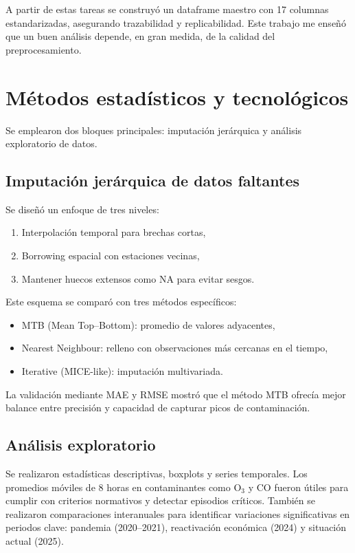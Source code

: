 \documentclass[12pt]{article}
\begin{document}
A partir de estas tareas se construyó un dataframe maestro con 17 columnas estandarizadas, asegurando trazabilidad y replicabilidad. Este trabajo me enseñó que un buen análisis depende, en gran medida, de la calidad del preprocesamiento.

\section*{Métodos estadísticos y tecnológicos}
Se emplearon dos bloques principales: imputación jerárquica y análisis exploratorio de datos.
\subsection*{Imputación jerárquica de datos faltantes}
Se diseñó un enfoque de tres niveles:
\begin{enumerate}[label=\arabic*.]
  \item Interpolación temporal para brechas cortas,
  \item Borrowing espacial con estaciones vecinas,
  \item Mantener huecos extensos como NA para evitar sesgos.
\end{enumerate}

Este esquema se comparó con tres métodos específicos:
\begin{itemize}
  \item MTB (Mean Top--Bottom): promedio de valores adyacentes,
  \item Nearest Neighbour: relleno con observaciones más cercanas en el tiempo,
  \item Iterative (MICE-like): imputación multivariada.
\end{itemize}

La validación mediante MAE y RMSE mostró que el método MTB ofrecía mejor balance entre precisión y capacidad de capturar picos de contaminación.

\subsection*{Análisis exploratorio}
Se realizaron estadísticas descriptivas, boxplots y series temporales. Los promedios móviles de 8 horas en contaminantes como O$_3$ y CO fueron útiles para cumplir con criterios normativos y detectar episodios críticos. También se realizaron comparaciones interanuales para identificar variaciones significativas en periodos clave: pandemia (2020--2021), reactivación económica (2024) y situación actual (2025).
\end{document}
